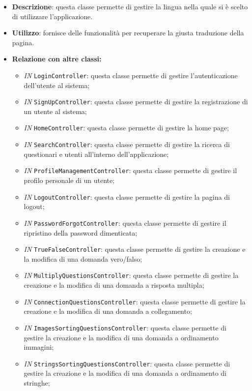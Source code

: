 \begin{itemize}
	\item \textbf{Descrizione}: questa classe permette di gestire la lingua nella quale si è scelto di utilizzare l'applicazione.
	\item \textbf{Utilizzo}: fornisce delle funzionalità per recuperare la giusta traduzione della pagina.
	\item \textbf{Relazione con altre classi:}
	\begin{itemize}
		\item \textit{IN} \texttt{LoginController}: questa classe permette di gestire l'autenticazione dell'utente al sistema; 
		\item \textit{IN} \texttt{SignUpController}: questa classe permette di gestire la registrazione di un utente al sistema;
		\item \textit{IN} \texttt{HomeController}: questa classe permette di gestire la home page;
		\item \textit{IN} \texttt{SearchController}: questa classe permette di gestire la ricerca di questionari e utenti all'interno dell'applicazione;
		\item \textit{IN} \texttt{ProfileManagementController}: questa classe permette di gestire il profilo personale di un utente;
		\item \textit{IN} \texttt{LogoutController}: questa classe permette di gestire la pagina di logout;
		\item \textit{IN} \texttt{PasswordForgotController}: questa classe permette di gestire il ripristino della password dimenticata;
		\item \textit{IN} \texttt{TrueFalseController}: questa classe permette di gestire la creazione e la modifica di una domanda vero/falso;
		\item \textit{IN} \texttt{MultiplyQuestionsController}: questa classe permette di gestire la creazione e la modifica di una domanda a risposta multipla; 
		\item \textit{IN} \texttt{ConnectionQuestionsController}: questa classe permette di gestire la creazione e la modifica di una domanda a collegamento;
		\item \textit{IN} \texttt{ImagesSortingQuestionsController}: questa classe permette di gestire la creazione e la modifica di una domanda a ordinamento immagini;
		\item \textit{IN} \texttt{StringsSortingQuestionsController}: questa classe permette di gestire la creazione e la modifica di una domanda a ordinamento di stringhe;

\end{itemize}
\end{itemize}

